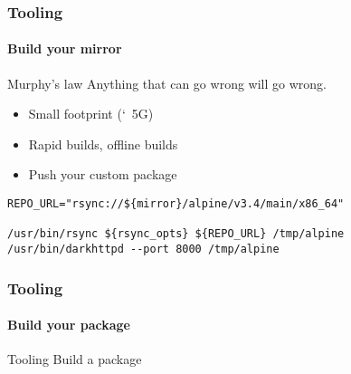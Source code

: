 \documentclass{beamer}
\begin{document}
\begin{frame}[fragile]
  \frametitle{Tooling}
  \framesubtitle{Build your mirror}

  \begin{exampleblock}{Murphy's law}
    \vskip2mm
    Anything that can go wrong will go wrong.
    \vskip2mm
  \end{exampleblock}

    \begin{itemize}
      \item Small footprint (\char`~5G)
      \item Rapid builds, offline builds
      \item Push your custom package
  \end{itemize}

  \begin{verbatim}
REPO_URL="rsync://${mirror}/alpine/v3.4/main/x86_64"

/usr/bin/rsync ${rsync_opts} ${REPO_URL} /tmp/alpine
/usr/bin/darkhttpd --port 8000 /tmp/alpine
  \end{verbatim}
\end{frame}

\begin{frame}
  \frametitle{Tooling}
  \framesubtitle{Build your package}

\end{frame}

\begin{frame}{Tooling}
  Build a package
\end{frame}
\end{document}
